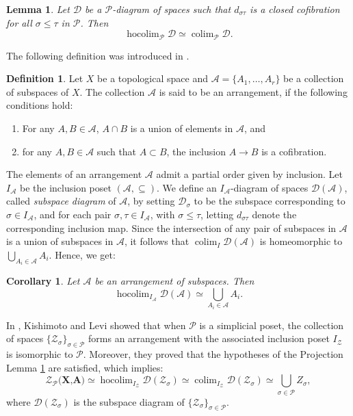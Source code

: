 \documentclass[a4paper,11pt]{article}
\newtheorem{corollary}[theorem]{Corollary}
\newtheorem{lemma}[theorem]{Lemma}
\theoremstyle{definition}
\newtheorem{definition}[theorem]{Definition}
\DeclareMathOperator*{\hocolim}{hocolim}
\DeclareMathOperator*{\colim}{colim}
\newcommand{\DD}{\mathcal{D}}
\newcommand{\PP}{\mathcal{P}}
\newcommand{\ZZ}{\mathcal{Z}}
\begin{document}
\begin{lemma}\label{proj-lemma}\cite[Proposition~3.1]{hocolim-comb} Let $\DD$ be a $\PP$-diagram of spaces such that $d_{\sigma\tau}$ is a closed cofibration for all $\sigma \leq \tau$ in $\PP$. Then 
\[
\hocolim_\PP \DD \simeq \colim_\PP \DD.
\]
\end{lemma}
The following definition was introduced in \cite[Definition~1.2]{homo-type-diagram}. 
\begin{definition}
	Let $X$ be a topological space and $\mathcal{A} = \{A_1, \ldots, A_r\}$ be a collection of subspaces of $X$. The collection $\mathcal{A}$ is said to be an arrangement, if the following conditions hold:
	\begin{enumerate}
		\item For any $A,B \in \mathcal{A}$, $A\cap B$ is a union of elements in $\mathcal{A}$, and 
		\item for any $A,B \in \mathcal{A}$ such that $A \subset B$, the inclusion $A \to B$ is a cofibration. 
	\end{enumerate}
\end{definition}
The elements of an arrangement $\mathcal{A}$ admit a partial order given by inclusion. Let $I_\mathcal{A}$ be the inclusion poset $(\mathcal{A}, \subseteq)$. We define an $I_\mathcal{A}$-diagram of spaces $\DD(\mathcal{A})$, called \emph{subspace diagram} of $\mathcal{A}$, by setting $\DD_\sigma$ to be the subspace corresponding to $\sigma \in I_\mathcal{A}$, and for each pair $\sigma,\tau \in I_\mathcal{A}$, with $\sigma\leq\tau$, letting $d_{\sigma\tau}$ denote the corresponding inclusion map. Since the intersection of any pair of subspaces in $\mathcal{A}$ is a union of subspaces in $\mathcal{A}$, it follows that $\colim_I \DD(\mathcal{A})$ is homeomorphic to $\bigcup_{A_i \in \mathcal{A}} A_i$. Hence, we get: 

\begin{corollary}\cite[Corollary~2.4]{poset-fiber-thm}
    Let $\mathcal{A}$ be an arrangement of subspaces. Then 
    \[
    \hocolim_{I_\mathcal{A}}\DD(\mathcal{A}) \simeq \bigcup_{A_i \in \mathcal{A}} A_i.
    \]
\end{corollary}

In \cite[Lemma~5.5, Proposition~5.6]{kishimoto2019polyhedral}, Kishimoto and Levi showed that when $\PP$ is a simplicial poset, the collection of spaces $\{\ZZ_\sigma\}_{\sigma \in \PP}$ forms an arrangement with the associated inclusion poset $I_\ZZ$ is isomorphic to $\PP$. Moreover, they proved that the hypotheses of the Projection Lemma \ref{proj-lemma} are satisfied, which implies: 
\begin{equation}\label{union-equiv-levi}
	\ZZ_\PP\textbf{(X,A)} \simeq \hocolim_{I_\ZZ} \DD(\ZZ_\sigma) \simeq \colim_{I_\ZZ} \DD(\ZZ_\sigma) \simeq \bigcup_{\sigma \in \PP} Z_\sigma,
\end{equation}
where $\DD(\ZZ_\sigma)$ is the subspace diagram of $\{\ZZ_\sigma\}_{\sigma \in \PP}$.
\end{document}
